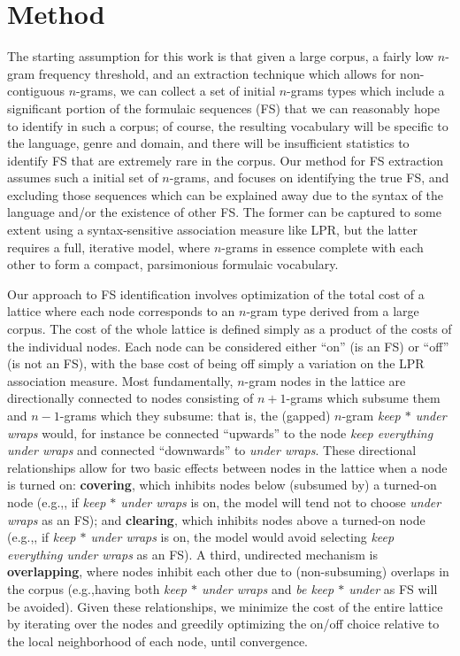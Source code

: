 \documentclass[11pt]{article}
\makeatletter
\def \eg {e.g.,\@ }
\newcommand{\gap}{$*$\xspace}
\newcommand{\ex}[1]{\textit{#1}\xspace}
\newcommand{\termdef}[1]{\textbf{#1}\xspace}
\makeatother
\begin{document}
\section{Method}

The starting assumption for this work is that given a large corpus, a fairly low $n$-gram frequency threshold, and an extraction technique which allows for non-contiguous $n$-grams, we can collect a set of initial $n$-grams types which include a significant portion of the formulaic sequences (FS) that we can reasonably hope to identify in such a corpus; of course, the resulting vocabulary will be specific to the language, genre and domain, and there will be insufficient statistics to identify FS that are extremely rare in the corpus. Our method for FS extraction assumes such a initial set of $n$-grams, and focuses on identifying the true FS, and excluding those sequences which can be explained away due to the syntax of the language and/or the existence of other FS. The former can be captured to some extent using a syntax-sensitive association measure like LPR, but the latter requires a full, iterative model, where $n$-grams in essence complete with each other to form a compact, parsimonious formulaic vocabulary.

Our approach to FS identification involves optimization of the total cost of a lattice where each node corresponds to an $n$-gram type derived from a large corpus. The cost of the whole lattice is defined simply as a product of the costs of the individual nodes. Each node can be considered either ``on'' (is an FS) or ``off'' (is not an FS), with the base cost of being off simply a variation on the LPR association measure. Most fundamentally, $n$-gram nodes in the lattice are directionally connected to nodes consisting of $n+1$-grams which subsume them and $n-1$-grams which they subsume: that is, the (gapped) $n$-gram \ex{keep \gap under wraps} would, for instance be connected ``upwards'' to the node \ex{keep everything under wraps} and connected ``downwards'' to \ex{under wraps}. These directional relationships allow for two basic effects between nodes in the lattice when a node is turned on: \termdef{covering}, which inhibits nodes below (subsumed by) a turned-on node (\eg, if \ex{keep \gap under wraps} is on, the model will tend not to choose \ex{under wraps} as an FS); and \termdef{clearing}, which inhibits nodes above a turned-on node (\eg, if \ex{keep \gap under wraps} is on, the model would avoid selecting \ex{keep everything under wraps} as an FS). A third, undirected mechanism is \termdef{overlapping}, where nodes inhibit each other due to (non-subsuming) overlaps in the corpus (\eg having both \ex{keep \gap under wraps} and \ex{be keep \gap under} as FS will be avoided). Given these relationships, we minimize the cost of the entire lattice by iterating over the nodes and greedily optimizing the on/off choice relative to the local neighborhood of each node, until convergence.
\end{document}
